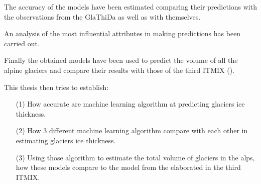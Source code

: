 The accuracy of the models have been estimated comparing their predictions with the observations from the GlaThiDa as well as with themselves.

An analysis of the most influential attributes in making predictions has been carried out.

Finally the obtained models have been used to predict the volume of all the alpine glaciers and compare their results with those of the third ITMIX (\citet{Farinotti2019}).


This thesis then tries to establish:
\begin{itemize}
\item[(1)] How accurate are machine learning algorithm at predicting glaciers ice thickness.
\item[(2)] How 3 different machine learning algorithm compare with each other in estimating glaciers ice thickness.
\item[(3)] Using those algorithm to estimate the total volume of glaciers in the alps, how these models compare to the model from the \cite{Farinotti2019} elaborated in the third ITMIX.
\end{itemize}

%
%

